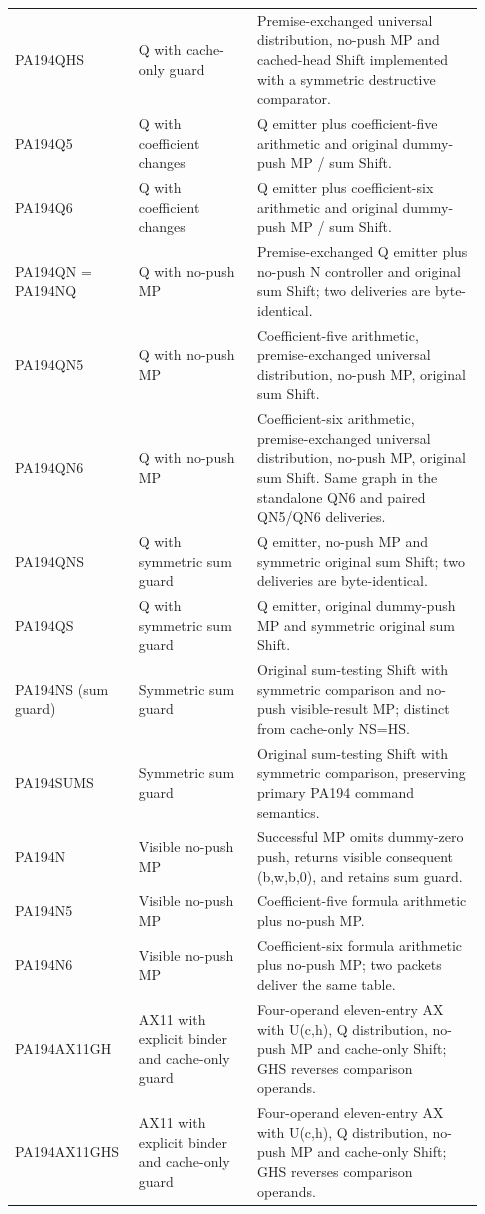 \begin{longtable}{>{\raggedright\arraybackslash}p{0.23\linewidth}>{\raggedright\arraybackslash}p{0.24\linewidth}>{\raggedright\arraybackslash}p{0.46\linewidth}}
PA194QHS&Q with cache-only guard&Premise-exchanged universal distribution, no-push MP and cached-head Shift implemented with a symmetric destructive comparator.\\[5pt]
PA194Q5&Q with coefficient changes&Q emitter plus coefficient-five arithmetic and original dummy-push MP /\allowbreak{} sum Shift.\\[5pt]
PA194Q6&Q with coefficient changes&Q emitter plus coefficient-six arithmetic and original dummy-push MP /\allowbreak{} sum Shift.\\[5pt]
PA194QN = PA194NQ&Q with no-push MP&Premise-exchanged Q emitter plus no-push N controller and original sum Shift; two deliveries are byte-identical.\\[5pt]
PA194QN5&Q with no-push MP&Coefficient-five arithmetic, premise-exchanged universal distribution, no-push MP, original sum Shift.\\[5pt]
PA194QN6&Q with no-push MP&Coefficient-six arithmetic, premise-exchanged universal distribution, no-push MP, original sum Shift. Same graph in the standalone QN6 and paired QN5/\allowbreak{}QN6 deliveries.\\[5pt]
PA194QNS&Q with symmetric sum guard&Q emitter, no-push MP and symmetric original sum Shift; two deliveries are byte-identical.\\[5pt]
PA194QS&Q with symmetric sum guard&Q emitter, original dummy-push MP and symmetric original sum Shift.\\[5pt]
PA194NS (sum guard)&Symmetric sum guard&Original sum-testing Shift with symmetric comparison and no-push visible-result MP; distinct from cache-only NS=HS.\\[5pt]
PA194SUMS&Symmetric sum guard&Original sum-testing Shift with symmetric comparison, preserving primary PA194 command semantics.\\[5pt]
PA194N&Visible no-push MP&Successful MP omits dummy-zero push, returns visible consequent (b,w,b,0), and retains sum guard.\\[5pt]
PA194N5&Visible no-push MP&Coefficient-five formula arithmetic plus no-push MP.\\[5pt]
PA194N6&Visible no-push MP&Coefficient-six formula arithmetic plus no-push MP; two packets deliver the same table.\\[5pt]
PA194AX11GH&AX11 with explicit binder and cache-only guard&Four-operand eleven-entry AX with U(c,h), Q distribution, no-push MP and cache-only Shift; GHS reverses comparison operands.\\[5pt]
PA194AX11GHS&AX11 with explicit binder and cache-only guard&Four-operand eleven-entry AX with U(c,h), Q distribution, no-push MP and cache-only Shift; GHS reverses comparison operands.\\[5pt]

\end{longtable}
